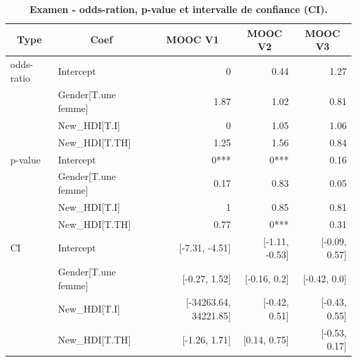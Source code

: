 \documentclass[12pt, a4paper, titlepage, table]{article}
\begin{document}
\begin{table}[H]
	\centering
	\fontsize{12}{20}\selectfont
	\begin{tabular}{|l|l|r|r|r|}
		\hline
		\multicolumn{1}{|c|}{\textbf{Type}}&
		\multicolumn{1}{c|}{\textbf{Coef}}&
		\multicolumn{1}{c|}{\textbf{MOOC V1}}&
		\multicolumn{1}{c|}{\textbf{MOOC V2}}&
		\multicolumn{1}{c|}{\textbf{MOOC V3}}\\
		\hline
		odds-ratio& Intercept&			0&		0.44&	1.27\\
		&			Gender[T.une femme]&1.87&		1.02&	0.81\\
		&			New\_HDI[T.I]&		0&		1.05&	1.06\\
		&			New\_HDI[T.TH]&		1.25&		1.56&	0.84\\
		\hline
		p-value&	Intercept	&		0***&		0***	&0.16\\
		&			Gender[T.une femme]&0.17&		0.83&	0.05\\
		&			New\_HDI[T.I]&		1&		0.85&	0.81\\
		&			New\_HDI[T.TH]&		0.77&		0***&	0.31\\
		\hline
		CI&			Intercept&			[-7.31, -4.51]&	[-1.11, -0.53]&	[-0.09, 0.57]\\
		&			Gender[T.une femme]&[-0.27, 1.52]&	[-0.16, 0.2]&	[-0.42, 0.0]\\
		&			New\_HDI[T.I]&		[-34263.64, 34221.85]&	[-0.42, 0.51]&	[-0.43, 0.55]\\
		&			New\_HDI[T.TH]&		[-1.26, 1.71]&	[0.14, 0.75]&	[-0.53, 0.17]\\
		\hline
	\end{tabular}
		\caption{\textbf{Examen - odds-ration, p-value et intervalle de confiance (CI).}}
\end{table}
\end{document}
